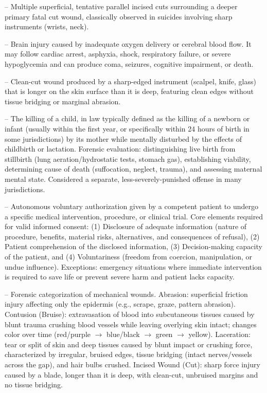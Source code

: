 -- Multiple superficial, tentative parallel incised cuts surrounding a deeper primary fatal cut wound, classically observed in suicides involving sharp instruments (wrists, neck).

-- Brain injury caused by inadequate oxygen delivery or cerebral blood flow. It may follow cardiac arrest, asphyxia, shock, respiratory failure, or severe hypoglycemia and can produce coma, seizures, cognitive impairment, or death.

-- Clean-cut wound produced by a sharp-edged instrument (scalpel, knife, glass) that is longer on the skin surface than it is deep, featuring clean edges without tissue bridging or marginal abrasion.

-- The killing of a child, in law typically defined as the killing of a newborn or infant (usually within the first year, or specifically within 24 hours of birth in some jurisdictions) by its mother while mentally disturbed by the effects of childbirth or lactation. Forensic evaluation: distinguishing live birth from stillbirth (lung aeration/hydrostatic tests, stomach gas), establishing viability, determining cause of death (suffocation, neglect, trauma), and assessing maternal mental state. Considered a separate, less-severely-punished offense in many jurisdictions.

-- Autonomous voluntary authorization given by a competent patient to undergo a specific medical intervention, procedure, or clinical trial. Core elements required for valid informed consent: (1) Disclosure of adequate information (nature of procedure, benefits, material risks, alternatives, and consequences of refusal), (2) Patient comprehension of the disclosed information, (3) Decision-making capacity of the patient, and (4) Voluntariness (freedom from coercion, manipulation, or undue influence). Exceptions: emergency situations where immediate intervention is required to save life or prevent severe harm and patient lacks capacity.

-- Forensic categorization of mechanical wounds. Abrasion: superficial friction injury affecting only the epidermis (e.g., scrape, graze, pattern abrasion). Contusion (Bruise): extravasation of blood into subcutaneous tissues caused by blunt trauma crushing blood vessels while leaving overlying skin intact; changes color over time (red/purple $\rightarrow$ blue/black $\rightarrow$ green $\rightarrow$ yellow). Laceration: tear or split of skin and deep tissues caused by blunt impact or crushing force, characterized by irregular, bruised edges, tissue bridging (intact nerves/vessels across the gap), and hair bulbs crushed. Incised Wound (Cut): sharp force injury caused by a blade, longer than it is deep, with clean-cut, unbruised margins and no tissue bridging.


